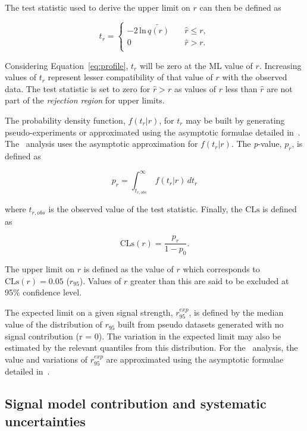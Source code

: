 The test statistic used to derive the upper limit on $r$ can then be defined as

\begin{equation}
t_r = 
\begin{cases}
-2\,\text{ln}\,\tilde{q(r)}\quad &\hat{r} \le r, \\ 
0 \quad &\hat{r} > r. \\ 
\end{cases}
\end{equation}

Considering Equation~\ref{eq:profile}, $t_r$ will be zero at the ML value of $r$.
Increasing values of $t_r$ represent lesser compatibility of that value of $r$ with
the observed data. The test statistic is set to zero for $\hat{r} > r$ as
values of $r$ less than $\hat{r}$ are not part of the \emph{rejection region} for upper limits. 

The probability density function, $f(t_r|r)$, for $t_r$ may be built by 
generating pseudo-experiments or approximated using the asymptotic formulae 
detailed in~\cite{asymp}. The \alphat~analysis uses the asymptotic
approximation for $f(t_r|r)$. The \textit{p}-value, $p_r$, is defined as

\begin{equation}
p_r = \int_{t_{r,obs}}^{\infty}\, f(t_r|r)\, dt_r
\end{equation}

where ${t_{r,obs}}$ is the observed value of the test statistic. Finally,
the $\text{CLs}$ is defined as

\begin{equation}
\text{CLs}(r) = \frac{p_r}{1-p_0}.
\end{equation}

The upper limit on $r$ is defined as the value of $r$ which corresponds to 
$\text{CLs}(r) = 0.05$ ($r_{95}$). Values of $r$ greater than this are said to be excluded at 95\%
confidence level.

The expected limit on a given signal strength, $r_{95}^{exp}$, is defined by the median value of the distribution
of $r_{95}$ built from pseudo datasets generated with no signal contribution (r = 0). The variation in the 
expected limit may also be estimated by the relevant quantiles from this distribution.
For the \alphat~analysis, the value and variations of $r_{95}^{exp}$ are approximated using 
the asymptotic formulae detailed in~\cite{asymp}.

\subsection{Signal model contribution and systematic uncertainties}

